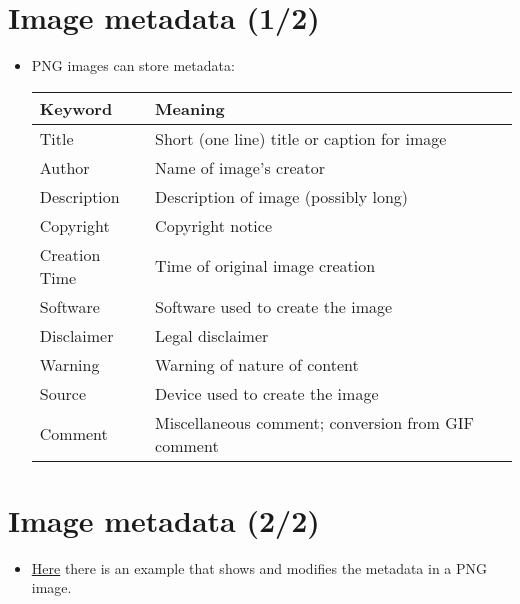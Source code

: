 \section{Image metadata (1/2)}
\begin{itemize}
\item \gls{PNG} images can store metadata:
  \begin{center}
    \begin{tabular}{l|l}
      Keyword & Meaning\\
      \hline
      Title & Short (one line) title or caption for image \\
      Author & Name of image's creator \\
      Description & Description of image (possibly long) \\
      Copyright & Copyright notice \\
      Creation Time & Time of original image creation \\
      Software & Software used to create the image \\
      Disclaimer & Legal disclaimer \\
      Warning & Warning of nature of content \\
      Source & Device used to create the image \\
      Comment & Miscellaneous comment; conversion from GIF comment
    \end{tabular}
  \end{center}
\end{itemize}

\section*{Image metadata (2/2)}
\begin{itemize}
\item
  \href{https://github.com/vicente-gonzalez-ruiz/medical_imaging/blob/main/notebooks/PNG_add_metadata.ipynb}{Here}
  there is an example that shows and modifies the metadata in a PNG
  image.
\end{itemize}